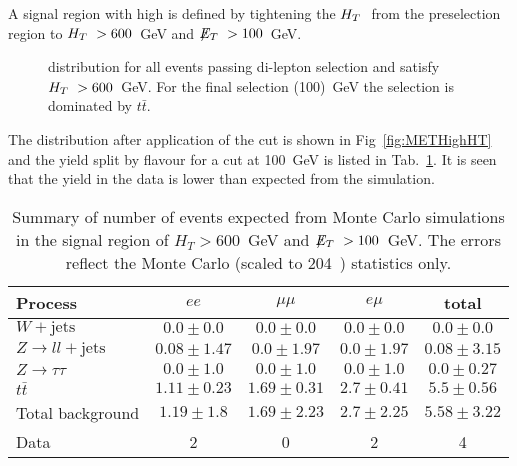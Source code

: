 A signal region with high \HT is defined by tightening the $H_T~$ 
from the preselection region to $H_T~>600$~GeV and $\displaystyle{\not} E_T~>100$~GeV.

\begin{figure}[hbtp]
  \hfill
  \caption{\MET distribution for all events passing di-lepton selection and satisfy $H_T~> 600$~GeV. For the final \MET selection (100)~GeV the selection is dominated by $t\bar{t}$.}
\end{figure}

The \MET distribution after application of the \HT
cut is shown in Fig~\ref{fig:METHighHT} and
the yield split by flavour for a cut at 100~GeV is listed in Tab.~\ref{tab:HighHT}.
It is seen that the yield in the data is lower than expected
from the simulation.

\begin{table}[htb]
\begin{center}
\caption{\label{tab:HighHT}\protect Summary of number of events expected from Monte Carlo simulations in 
the signal region of $H_T> 600$~GeV and $\displaystyle{\not} E_T~> 100$~GeV. The errors reflect the Monte Carlo (scaled
    to 204~\pbi) statistics only.}
\begin{tabular}{l|ccc|c}
\hline
Process           & $ee$       & $\mu\mu$     & $e\mu$   & total   \\
\hline\hline
$W+\textrm{jets}$&$0.0 \pm 0.0$&$0.0 \pm 0.0$&$0.0 \pm 0.0$&$0.0 \pm 0.0$\\
$Z\rightarrow ll+\textrm{jets}$&$0.08 \pm 1.47$&$0.0 \pm 1.97$&$0.0 \pm 1.97$&$0.08 \pm 3.15$\\
$Z \rightarrow \tau\tau$&$0.0 \pm 1.0$&$0.0 \pm 1.0$&$0.0 \pm 1.0$&$0.0 \pm 0.27$\\
$t\bar{t}$&$1.11 \pm 0.23$&$1.69 \pm 0.31$&$2.7 \pm 0.41$&$5.5 \pm 0.56$\\
\hline
Total background &$1.19 \pm 1.8$&$1.69 \pm 2.23$&$2.7 \pm 2.25$&$5.58 \pm 3.22$\\
\hline
Data  & 2 & 0 & 2 & 4 \\
\hline\hline
\end{tabular}
\end{center}
\end{table}


